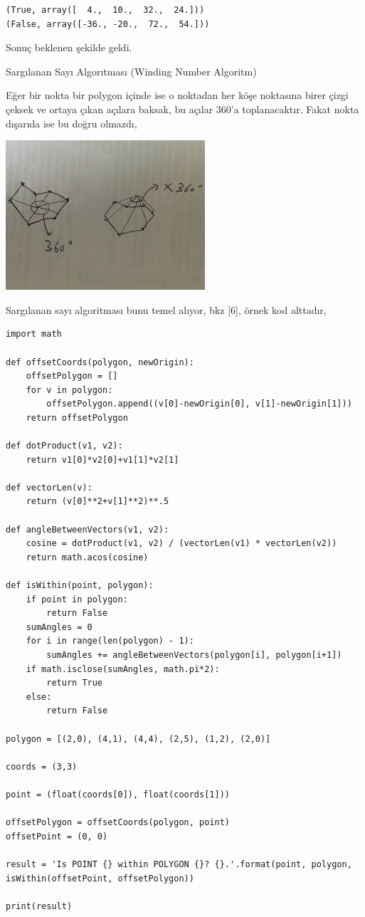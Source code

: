 \documentclass[12pt,fleqn]{article}\usepackage{../../common}
\begin{document}
\begin{verbatim}
(True, array([  4.,  10.,  32.,  24.]))
(False, array([-36., -20.,  72.,  54.]))
\end{verbatim}

Sonuç beklenen şekilde geldi. 

Sargılanan Sayı Algorıtması (Winding Number Algoritm)

Eğer bir nokta bir polygon içinde ise o noktadan her köşe noktasına birer
çizgi çeksek ve ortaya çıkan açılara baksak, bu açılar 360'a toplanacaktır.
Fakat nokta dışarıda ise bu doğru olmazdı, 

\includegraphics[width=20em]{winding.jpg}

Sargılanan sayı algoritması bunu temel alıyor, bkz [6], örnek kod alttadır,

\begin{verbatim}
import math

def offsetCoords(polygon, newOrigin):
    offsetPolygon = []
    for v in polygon:
        offsetPolygon.append((v[0]-newOrigin[0], v[1]-newOrigin[1]))
    return offsetPolygon

def dotProduct(v1, v2):
    return v1[0]*v2[0]+v1[1]*v2[1]

def vectorLen(v):
    return (v[0]**2+v[1]**2)**.5

def angleBetweenVectors(v1, v2):
    cosine = dotProduct(v1, v2) / (vectorLen(v1) * vectorLen(v2))
    return math.acos(cosine)

def isWithin(point, polygon):
    if point in polygon:
        return False
    sumAngles = 0
    for i in range(len(polygon) - 1):
        sumAngles += angleBetweenVectors(polygon[i], polygon[i+1])
    if math.isclose(sumAngles, math.pi*2):
        return True
    else:
        return False

polygon = [(2,0), (4,1), (4,4), (2,5), (1,2), (2,0)]

coords = (3,3)

point = (float(coords[0]), float(coords[1]))

offsetPolygon = offsetCoords(polygon, point)
offsetPoint = (0, 0)

result = 'Is POINT {} within POLYGON {}? {}.'.format(point, polygon, isWithin(offsetPoint, offsetPolygon))

print(result) 
\end{verbatim}
\end{document}
